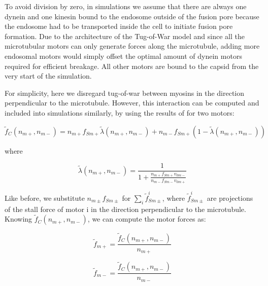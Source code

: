 To avoid division by zero, in simulations we assume that there are always one dynein and one kinesin bound to the endosome outside of the fusion pore because the endosome had to be transported inside the cell to initiate fusion pore formation. Due to the architecture of the Tug-of-War model and since all the microtubular motors can only generate forces along the microtubule, adding more endosomal motors would simply offset the optimal amount of dynein motors required for efficient breakage. All other motors are bound to the capsid from the very start of the simulation.

For simplicity, here we disregard tug-of-war between myosins in the direction perpendicular to the microtubule. However, this interaction can be computed and included into simulations similarly, by using the results of \cite{gennerich2007force, muller2008tug, norstrom2010unconventional} for two motors:

\begin{equation}
\tilde{f}_C(n_{m+}, n_{m-}) = n_{m+}f_{Sm+}\tilde{\lambda}(n_{m+}, n_{m-}) + n_{m-}f_{Sm+}(1 - \tilde{\lambda}(n_{m+}, n_{m-}))
\end{equation}

where

\begin{equation}
\tilde{\lambda}(n_{m+}, n_{m-}) = \frac{1}{1+\frac{n_{m+}f_{Sm+}v_{0m-}}{n_{m-}f_{Sm-}v_{0m+}}}
\end{equation}
 
Like before, we substitute $n_{m\pm}f_{Sm\pm}$ for $\sum_{i}\tilde{f}^i_{Sm\pm}$, where $\tilde{f}^i_{Sm\pm}$ are projections of the stall force of motor i in the direction perpendicular to the microtubule. Knowing $\tilde{f}_C(n_{m+}, n_{m-})$, we can compute the motor forces as:

\begin{equation}
\tilde{f}_{m+} = \frac{\tilde{f}_C(n_{m+}, n_{m-})}{n_{m+}}
\end{equation}

\begin{equation}
\tilde{f}_{m-} = \frac{\tilde{f}_C(n_{m+}, n_{m-})}{n_{m-}}
\end{equation}